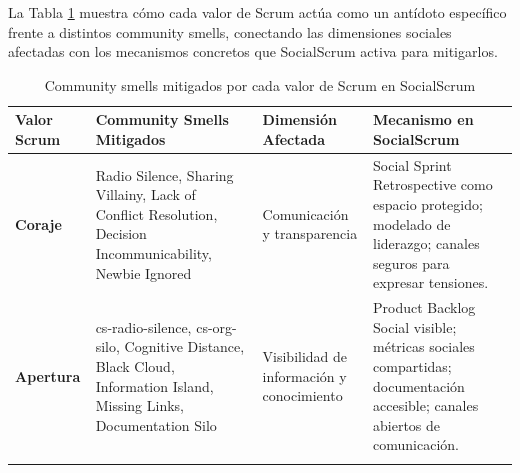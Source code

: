 La Tabla \ref{tab:valores_smells} muestra cómo cada valor de Scrum actúa como un antídoto específico frente a distintos community smells, conectando las dimensiones sociales afectadas con los mecanismos concretos que SocialScrum activa para mitigarlos.

\begin{table}[!htbp]
    \caption{Community smells mitigados por cada valor de Scrum en SocialScrum \cite{caballero2022communitysmells}}
    \label{tab:valores_smells}
    \centering
    \small
    \begin{tabular}{@{}p{2.2cm}p{4.2cm}p{3.2cm}p{4.3cm}@{}}
        \toprule
        \textbf{Valor Scrum}                                                                                                                                  & \textbf{Community Smells Mitigados} & \textbf{Dimensión Afectada} & \textbf{Mecanismo en SocialScrum} \\
        \midrule
        \textbf{Coraje}                                                                                                                                       &
        Radio Silence,  Sharing Villainy, Lack of Conflict Resolution, Decision Incommunicability, Newbie Ignored                                             &
        Comunicación y transparencia                                                                                                                          &
        Social Sprint Retrospective como espacio protegido; modelado de liderazgo; canales seguros para expresar tensiones.                                                                                                                                           \\
        \addlinespace
        \textbf{Apertura}                                                                                                                                     &
        \gls{cs-radio-silence}, \gls{cs-org-silo}, Cognitive Distance, Black Cloud, Information Island, Missing Links, Documentation Silo                     &
        Visibilidad de información y conocimiento                                                                                                             &
        Product Backlog Social visible; métricas sociales compartidas; documentación accesible; canales abiertos de comunicación.                                                                                                                                     \\
        \addlinespace


\end{tabular}
\end{table}
